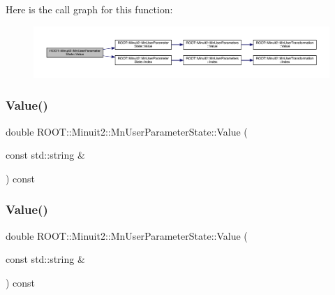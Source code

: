 Here is the call graph for this function\+:
\nopagebreak
\begin{figure}[H]
\begin{center}
\leavevmode
\includegraphics[width=350pt]{d3/de0/classROOT_1_1Minuit2_1_1MnUserParameterState_a02135107320f1ce5680fe25cf406f08f_cgraph}
\end{center}
\end{figure}
\mbox{\label{classROOT_1_1Minuit2_1_1MnUserParameterState_a02135107320f1ce5680fe25cf406f08f}} 
\subsubsection{\texorpdfstring{Value()}{Value()}\hspace{0.1cm}{\footnotesize\ttfamily [5/6]}}
{\footnotesize\ttfamily double R\+O\+O\+T\+::\+Minuit2\+::\+Mn\+User\+Parameter\+State\+::\+Value (\begin{DoxyParamCaption}\item[{const std\+::string \&}]{ }\end{DoxyParamCaption}) const}

\mbox{\label{classROOT_1_1Minuit2_1_1MnUserParameterState_a02135107320f1ce5680fe25cf406f08f}} 
\subsubsection{\texorpdfstring{Value()}{Value()}\hspace{0.1cm}{\footnotesize\ttfamily [6/6]}}
{\footnotesize\ttfamily double R\+O\+O\+T\+::\+Minuit2\+::\+Mn\+User\+Parameter\+State\+::\+Value (\begin{DoxyParamCaption}\item[{const std\+::string \&}]{ }\end{DoxyParamCaption}) const}

